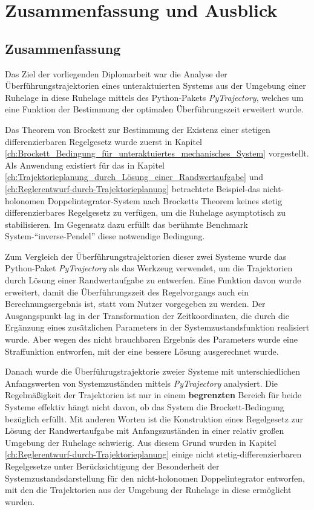 \chapter{Zusammenfassung und Ausblick}
\label{ch:Zusammenfassung_und_Ausblick}
\section{Zusammenfassung}
Das Ziel der vorliegenden Diplomarbeit war die Analyse der Überführungstrajektorien eines unteraktuierten Systems aus der Umgebung einer Ruhelage in diese Ruhelage mittels des Python-Pakets \emph{PyTrajectory}, welches um eine Funktion der Bestimmung der optimalen Überführungszeit erweitert wurde. 

Das Theorem von Brockett zur Bestimmung der Existenz einer stetigen differenzierbaren Regelgesetz wurde zuerst in Kapitel \ref{ch:Brockett_Bedingung_für_unteraktuiertes_mechanisches_System} vorgestellt. Als Anwendung existiert für das in Kapitel \ref{ch:Trajektorieplanung_durch_Lösung_einer_Randwertaufgabe} und \ref{ch:Reglerentwurf-durch-Trajektorieplanung} betrachtete Beispiel-das nicht-holonomen Doppelintegrator-System nach Brocketts Theorem keines stetig differenzierbares Regelgesetz zu verfügen, um die Ruhelage asymptotisch zu stabilisieren. Im Gegensatz dazu erfüllt das berühmte Benchmark System-``inverse-Pendel'' diese notwendige Bedingung.

Zum Vergleich der Überführungstrajektorien dieser zwei Systeme wurde das Python-Paket \emph{PyTrajectory} als das Werkzeug verwendet, um die Trajektorien durch Lösung einer Randwertaufgabe zu entwerfen. Eine Funktion davon wurde erweitert, damit die Überführungszeit des Regelvorgangs auch ein Berechnungsergebnis ist, statt vom Nutzer vorgegeben zu werden. Der Ausgangspunkt lag in der Transformation der Zeitkoordinaten, die durch die Ergänzung eines zusätzlichen Parameters in der Systemzustandsfunktion realisiert wurde. Aber wegen des nicht brauchbaren Ergebnis des Parameters wurde eine Straffunktion entworfen, mit der eine bessere Lösung ausgerechnet wurde.

Danach wurde die Überführugstrajektorie zweier Systeme mit unterschiedlichen Anfangswerten von Systemzuständen mittels \emph{PyTrajectory} analysiert. Die Regelmäßigkeit der Trajektorien ist nur in einem \textbf{begrenzten} Bereich für beide Systeme effektiv hängt nicht davon, ob das System die Brockett-Bedingung bezüglich erfüllt. Mit anderen Worten ist die Konstruktion eines Regelgesetz zur Lösung der Randwertaufgabe mit Anfangszuständen in einer relativ großen Umgebung der Ruhelage schwierig. Aus diesem Grund wurden in Kapitel \ref{ch:Reglerentwurf-durch-Trajektorieplanung} einige nicht stetig-differenzierbaren Regelgesetze unter Berücksichtigung der Besonderheit der Systemzustandsdarstellung für den nicht-holonomen Doppelintegrator entworfen, mit den die Trajektorien aus der Umgebung der Ruhelage in diese ermöglicht wurden. 
